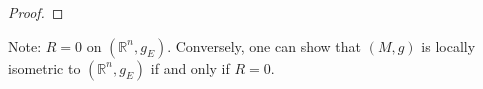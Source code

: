 \begin{proof}
\end{proof}


\begin{colremark}{}{}
Note: $R = 0$ on $(\mathbb{R}^n, g_E)$. Conversely, one can show that $(M,g)$ is locally isometric to $(\mathbb{R}^n, g_E)$ if and only if $R = 0$.
\end{colremark}














